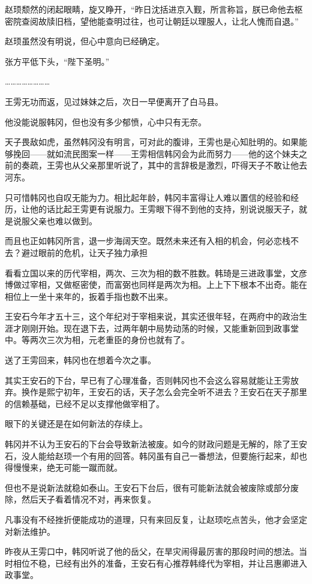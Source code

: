 赵顼颓然的闭起眼睛，旋又睁开，“昨日沈括进京入觐，所言称旨，朕已命他去枢密院查阅故牍旧档，望他能查明过往，也可让朝廷以理服人，让北人愧而自退。”

赵顼虽然没有明说，但心中意向已经确定。

张方平低下头，“陛下圣明。”

……………………

王雱无功而返，见过妹妹之后，次日一早便离开了白马县。

他没能说服韩冈，但也没有多少郁愤，心中只有无奈。

天子畏敌如虎，虽然韩冈没有明言，可对此的腹诽，王雱也是心知肚明的。如果能够挽回——就如流民图案一样——王雱相信韩冈会为此而努力——他的这个妹夫之前的奏疏，王雱也从父亲那里听说了，其中的言辞极是激烈，吓得天子不敢让他去河东。

只可惜韩冈也自叹无能为力。相比起年龄，韩冈丰富得让人难以置信的经验和经历，让他的话比起王雱更有说服力。王雱眼下得不到他的支持，别说说服天子，就是说服父亲也难以做到。

而且也正如韩冈所言，退一步海阔天空。既然未来还有入相的机会，何必恋栈不去？避过眼前的危机，让天子独力承担

看看立国以来的历代宰相，两次、三次为相的数不胜数。韩琦是三进政事堂，文彦博做过宰相，又做枢密使，而富弼也同样是两次为相。上上下下根本不出奇。能在相位上一坐十来年的，扳着手指也数不出来。

王安石今年才五十三，这个年纪对于宰相来说，其实还很年轻，在两府中的政治生涯才刚刚开始。现在退下去，过两年朝中局势动荡的时候，又能重新回到政事堂中。等两次三次为相，元老重臣的身份也就有了。

送了王雱回来，韩冈也在想着今次之事。

其实王安石的下台，早已有了心理准备，否则韩冈也不会这么容易就能让王雱放弃。换作是熙宁初年，王安石的话，天子怎么会完全听不进去？王安石在天子那里的信赖基础，已经不足以支撑他做宰相了。

眼下的关键还是在如何新法的存续上。

韩冈并不认为王安石的下台会导致新法被废。如今的财政问题是无解的，除了王安石，没人能给赵顼一个有用的回答。韩冈虽有自己一番想法，但要施行起来，却也得慢慢来，绝无可能一蹴而就。

但也不是说新法就稳如泰山。王安石下台后，很有可能新法就会被废除或部分废除，然后天子看着情况不对，再来恢复。

凡事没有不经挫折便能成功的道理，只有来回反复，让赵顼吃点苦头，他才会坚定对新法维护。

昨夜从王雱口中，韩冈听说了他的岳父，在旱灾闹得最厉害的那段时间的想法。当时相位不稳，已经有出外的准备，王安石有心推荐韩绛代为宰相，并让吕惠卿进入政事堂。

